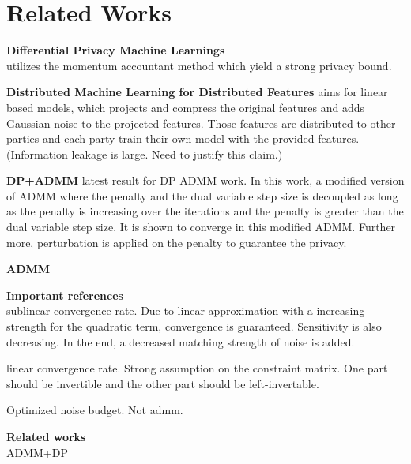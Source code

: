 \section{Related Works}

{\bf Differential Privacy Machine Learnings}\\
\cite{abadi2016deep} utilizes the momentum accountant method which yield a strong privacy bound. 

{\bf Distributed Machine Learning for Distributed Features}
\cite{heinze2017preserving} aims for linear based models, which projects and compress the original features and adds Gaussian noise to the projected features. Those features are distributed to other parties and each party train their own model with the provided features. (Information leakage is large. Need to justify this claim.)

{\bf DP+ADMM}
\cite{zhang2018improving} latest result for DP ADMM work. In this work, a modified version of ADMM where the penalty and the dual variable step size is decoupled as long as the penalty is increasing over the iterations and the penalty is greater than the dual variable step size. It is shown to converge in this modified ADMM. Further more, perturbation is applied on the penalty to guarantee the privacy. 

{\bf ADMM}

{\bf Important references}\\
\cite{huang2018dp} sublinear convergence rate. Due to linear approximation with a increasing strength for the quadratic term, convergence is guaranteed. Sensitivity is also decreasing. In the end, a decreased matching strength of noise is added. 

\cite{nishihara2015general} linear convergence rate. Strong assumption on the constraint matrix. One part should be invertible and the other part should be left-invertable. 

\cite{bellet2017personalized} Optimized noise budget. Not admm. 

\cite{shi2014linear}



{\bf Related works}\\
ADMM+DP\cite{zhang2016dual}

